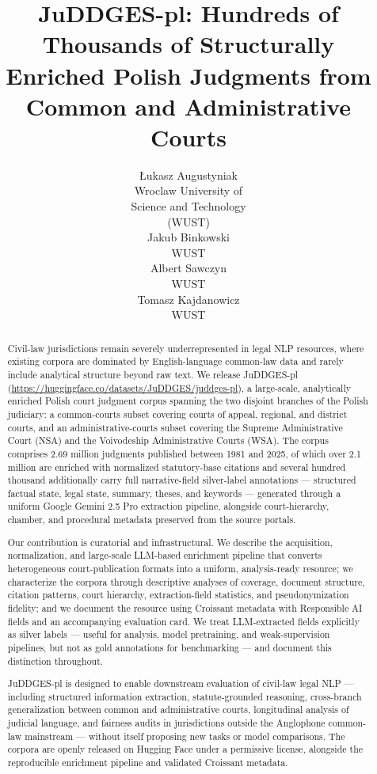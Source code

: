 \documentclass{article}
\title{JuDDGES-pl: Hundreds of Thousands of Structurally Enriched Polish Judgments from Common and Administrative Courts}
\author{%
  {\L}ukasz Augustyniak \\
  Wroclaw University of \\ Science and Technology \\ (WUST) \\
  \And
  Jakub Binkowski \\
  WUST \\
  \And
  Albert Sawczyn \\
  WUST \\
  \And
  Tomasz Kajdanowicz \\
  WUST \\
}
\begin{document}
\maketitle

\begin{abstract}
Civil-law jurisdictions remain severely underrepresented in legal NLP resources, where existing corpora are dominated by English-language common-law data and rarely include analytical structure beyond raw text. We release JuDDGES-pl (\url{https://huggingface.co/datasets/JuDDGES/juddges-pl}), a large-scale, analytically enriched Polish court judgment corpus spanning the two disjoint branches of the Polish judiciary: a common-courts subset covering courts of appeal, regional, and district courts, and an administrative-courts subset covering the Supreme Administrative Court (NSA) and the Voivodeship Administrative Courts (WSA). The corpus comprises 2.69 million judgments published between 1981 and 2025, of which over 2.1 million are enriched with normalized statutory-base citations and several hundred thousand additionally carry full narrative-field silver-label annotations --- structured factual state, legal state, summary, theses, and keywords --- generated through a uniform Google Gemini 2.5 Pro extraction pipeline, alongside court-hierarchy, chamber, and procedural metadata preserved from the source portals.

Our contribution is curatorial and infrastructural. We describe the acquisition, normalization, and large-scale LLM-based enrichment pipeline that converts heterogeneous court-publication formats into a uniform, analysis-ready resource; we characterize the corpora through descriptive analyses of coverage, document structure, citation patterns, court hierarchy, extraction-field statistics, and pseudonymization fidelity; and we document the resource using Croissant metadata with Responsible AI fields and an accompanying evaluation card. We treat LLM-extracted fields explicitly as silver labels --- useful for analysis, model pretraining, and weak-supervision pipelines, but not as gold annotations for benchmarking --- and document this distinction throughout.

JuDDGES-pl is designed to enable downstream evaluation of civil-law legal NLP --- including structured information extraction, statute-grounded reasoning, cross-branch generalization between common and administrative courts, longitudinal analysis of judicial language, and fairness audits in jurisdictions outside the Anglophone common-law mainstream --- without itself proposing new tasks or model comparisons. The corpora are openly released on Hugging Face under a permissive license, alongside the reproducible enrichment pipeline and validated Croissant metadata.
\end{abstract}
\end{document}
